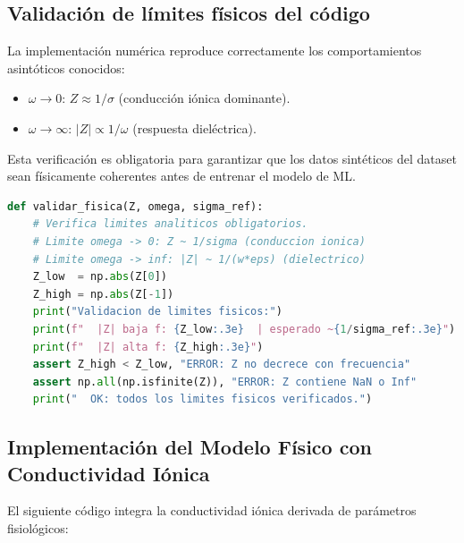 \documentclass[12pt]{article}
\begin{document}
\subsection{Validaci\'on de l\'imites f\'isicos del c\'odigo}

La implementaci\'on num\'erica reproduce correctamente los
comportamientos asint\'oticos conocidos:
\begin{itemize}
\item $\omega \to 0$: $Z \approx 1/\sigma$
(conducci\'on i\'onica dominante).
\item $\omega \to \infty$: $|Z| \propto 1/\omega$
(respuesta diel\'ectrica).
\end{itemize}
Esta verificaci\'on es obligatoria para garantizar que
los datos sint\'eticos del dataset sean f\'isicamente
coherentes antes de entrenar el modelo de ML.

\begin{lstlisting}[language=Python, caption={Funci\'on de validaci\'on de l\'imites f\'isicos (ejecutar antes de generar el dataset).}]
def validar_fisica(Z, omega, sigma_ref):
    # Verifica limites analiticos obligatorios.
    # Limite omega -> 0: Z ~ 1/sigma (conduccion ionica)
    # Limite omega -> inf: |Z| ~ 1/(w*eps) (dielectrico)
    Z_low  = np.abs(Z[0])
    Z_high = np.abs(Z[-1])
    print("Validacion de limites fisicos:")
    print(f"  |Z| baja f: {Z_low:.3e}  | esperado ~{1/sigma_ref:.3e}")
    print(f"  |Z| alta f: {Z_high:.3e}")
    assert Z_high < Z_low, "ERROR: Z no decrece con frecuencia"
    assert np.all(np.isfinite(Z)), "ERROR: Z contiene NaN o Inf"
    print("  OK: todos los limites fisicos verificados.")
\end{lstlisting}

\subsection{Implementaci\'on del Modelo F\'isico con Conductividad I\'onica}

El siguiente c\'odigo integra la conductividad i\'onica derivada de par\'ametros fisiol\'ogicos:
\end{document}
